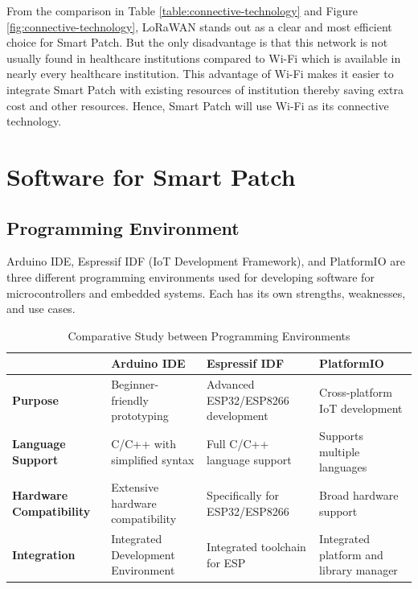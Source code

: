 From the comparison in Table \ref{table:connective-technology} and Figure \ref{fig:connective-technology}, LoRaWAN stands out as a clear and most efficient choice for Smart Patch. But the only disadvantage is that this network is not usually found in healthcare institutions compared to Wi-Fi which is available in nearly every healthcare institution. This advantage of Wi-Fi makes it easier to integrate Smart Patch with existing resources of institution thereby saving extra cost and other resources. Hence, Smart Patch will use Wi-Fi as its connective technology.

\newpage
\section{Software for Smart Patch}
\subsection{Programming Environment}
Arduino IDE, Espressif IDF (IoT Development Framework), and PlatformIO are three different programming environments used for developing software for microcontrollers and embedded systems. Each has its own strengths, weaknesses, and use cases.

\begin{table}[h]
    \centering
    \begin{tabularx}{\textwidth}{|X|X|X|X|}
        \hline
            
         & \textbf{Arduino IDE} 
         & \textbf{Espressif IDF} 
         & \textbf{PlatformIO} \\ \hline

         \textbf{Purpose} 
         & Beginner-friendly prototyping 
         & Advanced ESP32/ESP8266 development
         & Cross-platform IoT development \\ \hline

         \textbf{Language Support}
         & C/C++ with simplified syntax
         & Full C/C++ language support
         & Supports multiple languages \\ \hline

         \textbf{Hardware Compatibility}
         & Extensive hardware compatibility
         & Specifically for ESP32/ESP8266 
         & Broad hardware support \\ \hline

         \textbf{Integration}
         & Integrated Development Environment
         & Integrated toolchain for ESP 
         & Integrated platform and library manager \\ \hline
    
    \end{tabularx}
    \caption{Comparative Study between Programming Environments}
    \label{table:programming-environment}
\end{table}

